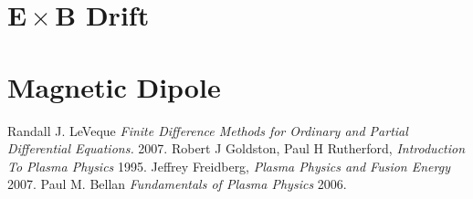 \documentclass[11pt]{report}
\begin{document}
\section{$\bm{E} \times \bm{B}$ Drift}


\section{Magnetic Dipole}


\begin{thebibliography}{1}

   Randall J. LeVeque {\em Finite Difference Methods for Ordinary and Partial Differential Equations.}  2007.
   Robert J Goldston, Paul H Rutherford, {\em Introduction To Plasma Physics}  1995.
   Jeffrey Freidberg, {\em Plasma Physics and Fusion Energy}  2007.
   Paul M. Bellan {\em Fundamentals of Plasma Physics}  2006.

  \end{thebibliography}
\end{document}
